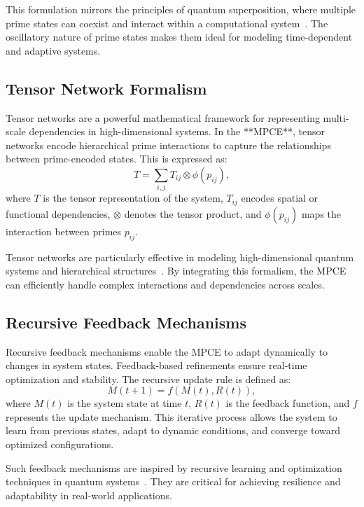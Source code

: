 \documentclass{article}
\theoremstyle{plain}
\begin{document}
This formulation mirrors the principles of quantum superposition, where multiple prime states can coexist and interact within a computational system~\cite{deutsch1985quantum, feynman2010quantum}. The oscillatory nature of prime states makes them ideal for modeling time-dependent and adaptive systems.

\subsection{Tensor Network Formalism}

Tensor networks are a powerful mathematical framework for representing multi-scale dependencies in high-dimensional systems. In the **MPCE**, tensor networks encode hierarchical prime interactions to capture the relationships between prime-encoded states. This is expressed as:
\begin{equation}
    T = \sum_{i, j} T_{ij} \otimes \phi(p_{ij}),
\end{equation}
where \( T \) is the tensor representation of the system, \( T_{ij} \) encodes spatial or functional dependencies, \( \otimes \) denotes the tensor product, and \( \phi(p_{ij}) \) maps the interaction between primes \( p_{ij} \).

Tensor networks are particularly effective in modeling high-dimensional quantum systems and hierarchical structures~\cite{vidal2003efficient, white1992tensor}. By integrating this formalism, the MPCE can efficiently handle complex interactions and dependencies across scales.

\subsection{Recursive Feedback Mechanisms}

Recursive feedback mechanisms enable the MPCE to adapt dynamically to changes in system states. Feedback-based refinements ensure real-time optimization and stability. The recursive update rule is defined as:
\begin{equation}
    M(t+1) = f(M(t), R(t)),
\end{equation}
where \( M(t) \) is the system state at time \( t \), \( R(t) \) is the feedback function, and \( f \) represents the update mechanism. This iterative process allows the system to learn from previous states, adapt to dynamic conditions, and converge toward optimized configurations.

Such feedback mechanisms are inspired by recursive learning and optimization techniques in quantum systems~\cite{shor1994algorithms, grover1996fast}. They are critical for achieving resilience and adaptability in real-world applications.
\end{document}
